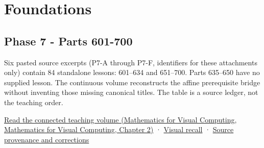\hypertarget{appendix-fd090d982a15}{}\label{referencestart:appendix-fd090d982a15}
\section{Foundations}\label{appendix-fd090d982a15-foundations}

\subsection{Phase 7 - Parts 601-700}\label{appendix-fd090d982a15-phase-7---parts-601-700}

Six pasted source excerpts (P7-A through P7-F, identifiers for these attachments only) contain 84 standalone lessons: 601--634 and 651--700. Parts 635--650 have no supplied lesson. The continuous volume reconstructs the affine prerequisite bridge without inventing those missing canonical titles. The table is a source ledger, not the teaching order.

\href{../02-Mathematics-for-Visual-Computing/main.pdf\#nameddest=01-foundations-i-ch018-keep-the-promises-visible-while-moving-between-representations}{Read the connected teaching volume (Mathematics for Visual Computing, Mathematics for Visual Computing, Chapter 2)} · \hyperref[appendix-68f22c734be3]{Visual recall} · \hyperref[appendix-a103e7846d21-phase-7---source-analysis-and-verification]{Source provenance and corrections}

